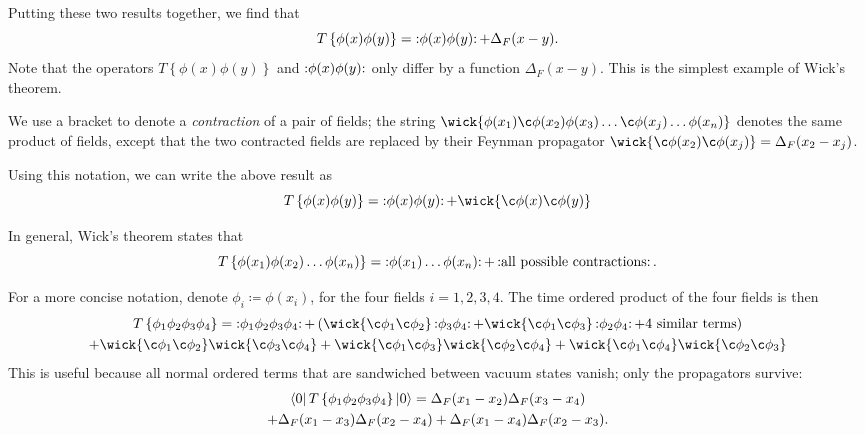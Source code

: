 Putting these two results together, we find that
\begin{equation}
  T \left\{ \phi(x) \phi(y) \right\} = \mathop{:}\nolimits\!\phi(x) \phi(y) \!\mathop{:}\nolimits + \Delta_F(x - y).
\end{equation}
Note that the operators $T \left\{ \phi(x) \phi(y) \right\}$ and $\mathop{:}\nolimits\!\phi(x) \phi(y) \!\mathop{:}\nolimits$ only differ by a function $\Delta_F(x - y)$.
This is the simplest example of Wick's theorem.
\begin{notation}
  We use a bracket to denote a \emph{contraction} of a pair of fields; the string $\wick{\phi(x_1) \c\phi(x_2) \phi(x_3)\dots \c\phi(x_j) \dots \phi(x_n)}$ denotes the same product of fields, except that the two contracted fields are replaced by their Feynman propagator $\wick{\c\phi(x_2) \c\phi(x_j)} = \Delta_F(x_2 - x_j)$.
\end{notation}
Using this notation, we can write the above result as
\begin{equation}
  T \left\{ \phi(x) \phi(y) \right\} = \normalorder{\phi(x) \phi(y) } + \wick{\c\phi(x) \c\phi(y)}
\end{equation}
\begin{theorem}
  In general, Wick's theorem states that
  \begin{equation}
    T \left\{ \phi(x_1) \phi(x_2) \dots \phi(x_n) \right\} = \mathop{:}\nolimits\!\phi(x_1) \dots \phi(x_n) \!\mathop{:}\nolimits + \mathop{:}\nolimits\!\text{all possible contractions} \!\mathop{:}\nolimits.
  \end{equation}
\end{theorem}
\begin{example}
  For a more concise notation, denote $\phi_i \coloneqq \phi(x_i)$, for the four fields $i = 1, 2, 3, 4$.
  The time ordered product of the four fields is then
  \begin{multline}
    T \left\{ \phi_1 \phi_2 \phi_3 \phi_4 \right\} 
    = \normalorder{\phi_1 \phi_2 \phi_3\phi_4 }
    + \left( \wick{\c\phi_1 \c\phi_2} \normalorder{\phi_3 \phi_4} + \wick{\c\phi_1 \c\phi_3} \normalorder{\phi_2 \phi_4}
    + \text{4 similar terms}\right)\\ 
    + \wick{\c\phi_1 \c\phi_2} \wick{\c\phi_3\c\phi_4}
    + \wick{\c\phi_1 \c\phi_3} \wick{\c\phi_2 \c\phi_4} + \wick{\c\phi_1\c\phi_4}\wick{\c\phi_2\c\phi_3}
  \end{multline}
  This is useful because all normal ordered terms that are sandwiched between vacuum states vanish; only the propagators survive:
  \begin{multline}
    \label{eq:four-field-tordered-product}
    \bra{0} T \left\{ \phi_1\phi_2\phi_3\phi_4 \right\} \ket{0} 
    = \Delta_F (x_1 - x_2) \Delta_F(x_3-x_4) \\ 
    + \Delta_F(x_1 - x_3) \Delta_F(x_2-x_4)
    + \Delta_F(x_1-x_4) \Delta_F(x_2 - x_3).
  \end{multline}
\end{example}
